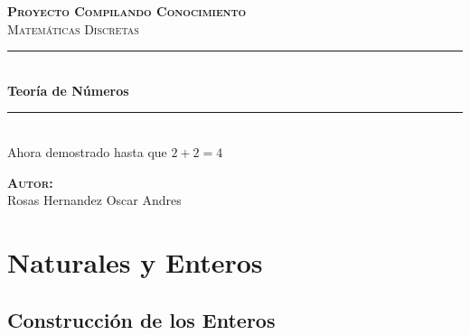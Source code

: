 \documentclass[12pt, fleqn]{report}                             %
\author{Oscar Andrés Rosas}                                     %
\begin{document}
\begin{titlepage}

	\center
	\textbf{\textsc{\Large Proyecto Compilando Conocimiento}}\\[1.0cm] 
	\textsc{\Large Matemáticas Discretas}\\[1.0cm] 

	\rule{\linewidth}{0.5mm} \\[1.0cm]
		{ \huge \bfseries Teoría de Números}\\[1.0cm] 
	\rule{\linewidth}{0.5mm} \\[2.0cm]
	
	{\LARGE Ahora demostrado hasta que $2 + 2 = 4$}\\[7cm] 
	
	\begin{center} \large
	\textbf{\textsc{Autor:}}\\
	Rosas Hernandez Oscar Andres
	\end{center}

	\vfill

\end{titlepage}

\tableofcontents{}
\label{sec:Index}

\clearpage










\chapter{Naturales y Enteros}
    \clearpage


    \section{Construcción de los Enteros}
\end{document}
